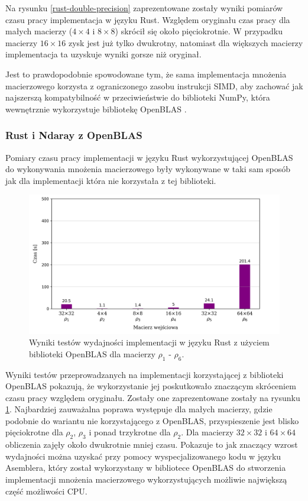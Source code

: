 \documentclass[11pt, a4paper]{article}
\begin{document}
\begin{sloppypar}
    Na rysunku \ref{rust-double-precision} zaprezentowane zostały wyniki pomiarów czasu pracy
    implementacja w języku Rust. Względem oryginału czas pracy dla małych macierzy ($4\times
    4$ i $8\times8$) skrócił się około pięciokrotnie. W przypadku macierzy $16\times16$ zysk
    jest już tylko dwukrotny, natomiast dla większych macierzy implementacja ta uzyskuje
    wyniki gorsze niż oryginał.

    Jest to prawdopodobnie spowodowane tym, że sama implementacja mnożenia macierzowego korzysta
    z ograniczonego zasobu instrukcji SIMD, aby zachować jak najszerszą kompatybilność w
    przeciwieństwie do biblioteki NumPy, która wewnętrznie wykorzystuje bibliotekę OpenBLAS
    \cite{NumPy_Doc}.

    \subsubsection{ Rust i Ndaray z OpenBLAS }
    Pomiary czasu pracy implementacji w języku Rust wykorzystującej OpenBLAS do wykonywania
    mnożenia macierzowego były wykonywane w taki sam sposób jak dla implementacji która nie
    korzystała z tej biblioteki.

    \begin{figure}[!ht]
      \centering
      \includegraphics[width=1.0\textwidth]{"resources/rust_blas_perf_tests.png"}
      \caption{Wyniki testów wydajności implementacji w języku Rust z użyciem biblioteki OpenBLAS dla macierzy $\rho
      _{1}$ - $\rho_{6}$.}
      \label{rust-openblas-double-precision}
    \end{figure}

    Wyniki testów przeprowadzanych na implementacji korzystającej z biblioteki OpenBLAS
    pokazują, że wykorzystanie jej poskutkowało znaczącym skróceniem czasu pracy względem
    oryginału. Zostały one zaprezentowane zostały na rysunku
    \ref{rust-openblas-double-precision}. Najbardziej zauważalna poprawa występuje dla małych
    macierzy, gdzie podobnie do wariantu nie korzystającego z OpenBLAS, przyspieszenie jest
    blisko pięciokrotne dla $\rho_{2}$, $\rho_{3}$ i ponad trzykrotne dla $\rho_{2}$. Dla
    macierzy $32\times32$ i $64\times64$ obliczenia zajęły około dwukrotnie mniej czasu.
    Pokazuje to jak znaczący wzrost wydajności można uzyskać przy pomocy
    wyspecjalizowanego kodu w języku Asemblera, który został wykorzystany w bibliotece OpenBLAS
    do stworzenia implementacji mnożenia macierzowego wykorzystujących możliwie największą
    część możliwości CPU.


\end{sloppypar}
\end{document}
